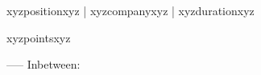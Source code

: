 xyzpositionxyz | xyzcompanyxyz | xyzdurationxyz
\begin{itemize}
xyzpointsxyz
\end{itemize}
-----
Inbetween: \vspace{4pt}
